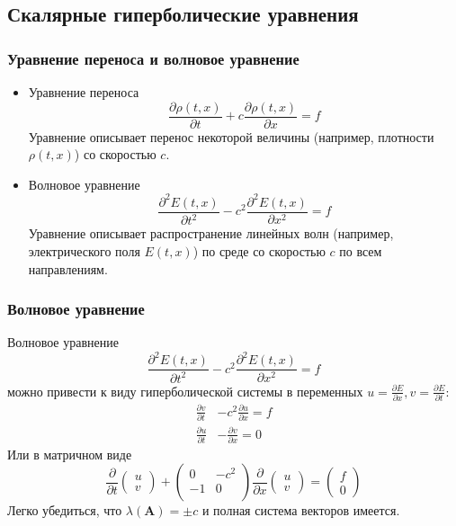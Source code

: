 \documentclass[professionalfonts,compress,unicode,aspectratio=169]{beamer}
\begin{document}
\subsection{Скалярные гиперболические уравнения}
\begin{frame}\frametitle{Уравнение переноса и волновое уравнение}
\begin{itemize}
	\item Уравнение переноса
	\[
	\frac{\partial \rho(t,x)}{\partial t} + c \frac{\partial \rho(t,x)}{\partial x} = f
	\]
	Уравнение описывает перенос некоторой величины (например, плотности $\rho(t,x)$) со скоростью $c$.
	\item Волновое уравнение
	\[
	\frac{\partial^2 E(t,x)}{\partial t^2} - c^2 \frac{\partial^2 E(t,x)}{\partial x^2} = f
	\]
	Уравнение описывает распространение линейных волн (например, электрического поля $E(t,x)$) по среде со скоростью $c$ по всем направлениям.
\end{itemize}
\end{frame}

\begin{frame}\frametitle{Волновое уравнение}
	Волновое уравнение
	\[
	\frac{\partial^2 E(t,x)}{\partial t^2} - c^2 \frac{\partial^2 E(t,x)}{\partial x^2} = f
	\]
	можно привести к виду гиперболической системы в переменных $u=\frac{\partial E}{\partial x}, v = \frac{\partial E}{\partial t}$:
	\begin{align*}
	\frac{\partial v}{\partial t} &- c^2 \frac{\partial u}{\partial x} = f\\
	\frac{\partial u}{\partial t} &- \frac{\partial v}{\partial x} = 0
	\end{align*}
	Или в матричном виде
	\[
	\frac{\partial}{\partial t} \begin{pmatrix}u\\v\end{pmatrix} + \begin{pmatrix}
		0 & -c^2\\
		-1 & 0\\
	\end{pmatrix}
	\frac{\partial}{\partial x}\begin{pmatrix}u\\v\end{pmatrix} = \begin{pmatrix}f\\0\end{pmatrix}
	\]
	Легко убедиться, что $\lambda(\mathbf{A}) = \pm c$ и полная система векторов имеется.
\end{frame}
\end{document}
